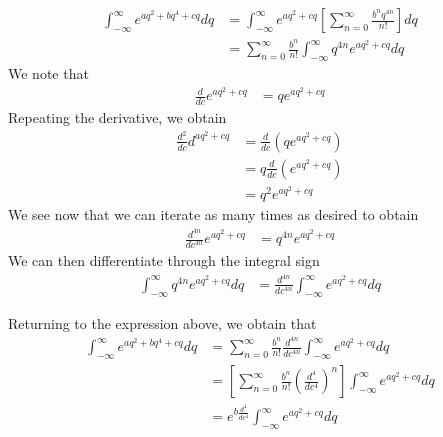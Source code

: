 \documentclass[book.tex]{subfiles}
\begin{document}
\begin{align}
    \int_{-\infty}^{\infty} e^{a q^2 + b q^4 + cq} dq
    &= \int_{-\infty}^{\infty} e^{a q^2 + cq} \left [ \sum_{n=0}^\infty \frac{b^n q^{4n}}{n!} \right ] dq \\
    &= \sum_{n=0}^{\infty} \frac{b^n}{n!} \int_{-\infty}^{\infty} q^{4n} e^{aq^2 + cq} dq
\end{align}
We note that
\begin{align}
    \frac{d}{dc} e^{aq^2 + cq} &= q e^{aq^2 + cq}
\end{align}
Repeating the derivative, we obtain
\begin{align}
    \frac{d^2}{dc} d^{aq^2 + cq} &= \frac{d}{dc} (qe^{aq^2 + cq}) \\
    &= q \frac{d}{dc} (e^{aq^2 + cq}) \\
    &= q^2 e^{aq^2 + cq} 
\end{align}
We see now that we can iterate as many times as desired to obtain
\begin{align}
    \frac{d^{4n}}{dc^{4n}} e^{aq^2 + cq} &= q^{4n} e^{aq^2 + cq}
\end{align}
We can then differentiate through the integral sign %
\begin{align}
    \int_{-\infty}^{\infty} q^{4n}e^{aq^2 + cq} dq &= \frac{d^{4n}}{dc^{4n}} \int_{-\infty}^{\infty} e^{aq^2 + cq} dq
\end{align}

Returning to the expression above, we obtain that
\begin{align}
    \int_{-\infty}^{\infty} e^{aq^2 + bq^4 + cq} dq &= \sum_{n=0}^{\infty} \frac{b^n}{n!} \frac{d^{4n}}{dc^{4n}} \int_{-\infty}^{\infty} e^{aq^2 + cq} dq \\
    &= \left [ \sum_{n=0}^\infty \frac{b^n}{n!}\left ( \frac{d^4}{dc^4}\right )^n\right ] \int_{-\infty}^{\infty} e^{aq^2 + cq} dq \\
    &= e^{b \frac{d^4}{dc^4}} \int_{-\infty}^{\infty} e^{aq^2 + cq} dq
\end{align}
\end{document}

